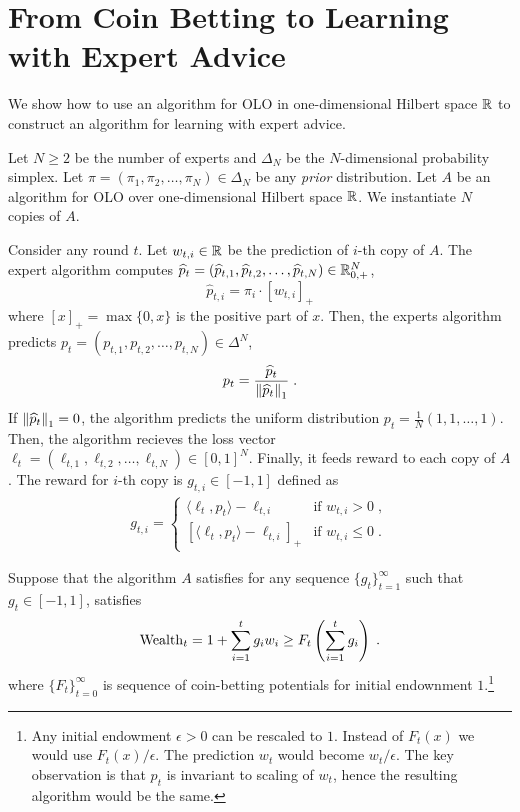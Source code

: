 \section{From Coin Betting to Learning with Expert Advice}
\label{section:reduction-experts}

We show how to use an algorithm for OLO in one-dimensional Hilbert space $\mathbb{R}$
to construct an algorithm for learning with expert advice.

Let $N \ge 2$ be the number of experts and $\Delta_N$ be the $N$-dimensional
probability simplex. Let $\pi = (\pi_1, \pi_2, \dots, \pi_N) \in \Delta_N$ be
any \emph{prior} distribution. Let $A$ be an algorithm for OLO over
one-dimensional Hilbert space $\mathbb{R}$. We instantiate $N$ copies of $A$.

Consider any round $t$. Let $w_{t,i} \in \mathbb{R}$ be the prediction of $i$-th copy of
$A$. The expert algorithm computes $\widehat p_t = (\widehat p_{t,1}, \widehat
p_{t,2}, \dots, \widehat p_{t,N}) \in \mathbb{R}_{0,+}^N$,
$$
\widehat p_{t,i} = \pi_i \cdot [w_{t,i}]_+
$$
where $[x]_+ = \max\{0,x\}$ is the positive part of $x$. Then, the experts
algorithm predicts $p_t = (p_{t,1}, p_{t,2}, \dots, p_{t,N}) \in \Delta^N$,
$$
p_t = \frac{\widehat p_t}{\left\|{\widehat p_t}\right\|_1} \; .
$$
If $\left\|{\widehat p_t}\right\|_1 = 0$, the algorithm predicts the uniform distribution
$p_t = \frac{1}{N}(1,1,\dots,1)$. Then, the algorithm recieves the loss vector
$\ell_t = (\ell_{t,1}, \ell_{t,2}, \dots, \ell_{t,N}) \in [0,1]^N$. Finally, it
feeds reward to each copy of $A$. The reward for $i$-th copy is $g_{t,i} \in
[-1,1]$ defined as
\begin{align}
g_{t,i} =
\begin{cases}
\langle \ell_t, p_t \rangle - \ell_{t,i} & \text{if } w_{t,i} > 0 \; , \\
\left[\langle \ell_t, p_t \rangle - \ell_{t,i} \right]_+ & \text{if } w_{t,i} \le 0 \; .
\end{cases}
\end{align}

Suppose that the algorithm $A$ satisfies for any sequence
$\{g_t\}_{t=1}^\infty$ such that $g_t \in [-1,1]$, satisfies
\begin{equation}
\label{equation:experts-one-dimensional-assumption}
\operatorname{Wealth}_t = 1 + \sum_{i=1}^t g_i w_i \ge F_t\left(\sum_{i=1}^t g_i\right) \; .
\end{equation}
where $\{F_t\}_{t=0}^\infty$ is sequence of coin-betting potentials for initial
endownment $1$.\footnote{Any initial endowment $\epsilon > 0$ can be rescaled to
$1$. Instead of $F_t(x)$ we would use $F_t(x)/\epsilon$. The prediction $w_t$
would become $w_t/\epsilon$. The key observation is that $p_t$ is invariant to
scaling of $w_t$, hence the resulting algorithm would be the same.}

